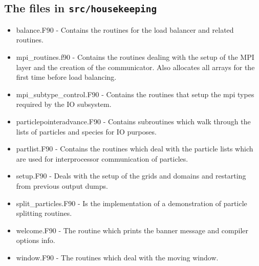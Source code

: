 \documentclass[12pt,a4paper]{article}
\newcommand{\inlinecode}[1]{{\color{warwickred} \bf\texttt{#1}}}
\begin{document}
\subsection{The files in \inlinecode{src/housekeeping}}
\begin{itemize}
\item balance.F90 - Contains the routines for the load balancer and related
  routines.
\item mpi\_routines.f90 - Contains the routines dealing with the setup of the
  MPI layer and the creation of the communicator. Also allocates all arrays
  for the first time before load balancing.
\item mpi\_subtype\_control.F90 - Contains the routines that setup the mpi
  types required by the IO subsystem.
\item particlepointeradvance.F90 - Contains subroutines which walk through the
  lists of particles and species for IO purposes.
\item partlist.F90 - Contains the routines which deal with the particle lists
  which are used for interprocessor communication of particles.
\item setup.F90 - Deals with the setup of the grids and domains and restarting
  from previous output dumps.
\item split\_particles.F90 - Is the implementation of a demonstration of
  particle splitting routines.
\item welcome.F90 - The routine which prints the banner message and compiler
  options info.
\item window.F90 - The routines which deal with the moving window.
\end{itemize}
\end{document}
